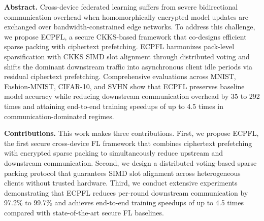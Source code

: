 \noindent\textbf{Abstract.}
Cross-device federated learning suffers from severe bidirectional communication overhead when homomorphically encrypted model updates are exchanged over bandwidth-constrained edge networks.
To address this challenge, we propose ECPFL, a secure CKKS-based framework that co-designs efficient sparse packing with ciphertext prefetching.
ECPFL harmonizes pack-level sparsification with CKKS SIMD slot alignment through distributed voting and shifts the dominant downstream traffic into asynchronous client idle periods via residual ciphertext prefetching.
Comprehensive evaluations across MNIST, Fashion-MNIST, CIFAR-10, and SVHN show that ECPFL preserves baseline model accuracy while reducing downstream communication overhead by 35 to 292 times and attaining end-to-end training speedups of up to 4.5 times in communication-dominated regimes.

\noindent\textbf{Contributions.}
This work makes three contributions.
First, we propose ECPFL, the first secure cross-device FL framework that combines ciphertext prefetching with encrypted sparse packing to simultaneously reduce upstream and downstream communication.
Second, we design a distributed voting-based sparse packing protocol that guarantees SIMD slot alignment across heterogeneous clients without trusted hardware.
Third, we conduct extensive experiments demonstrating that ECPFL reduces per-round downstream communication by 97.2\% to 99.7\% and achieves end-to-end training speedups of up to 4.5 times compared with state-of-the-art secure FL baselines.

